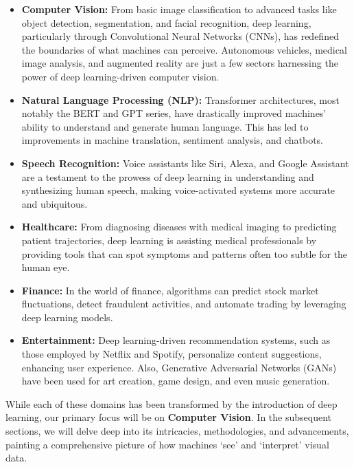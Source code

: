 \begin{itemize}
    \item \textbf{Computer Vision:} From basic image classification to advanced tasks like object detection, segmentation, and facial recognition, deep learning, particularly through Convolutional Neural Networks (CNNs), has redefined the boundaries of what machines can perceive. Autonomous vehicles, medical image analysis, and augmented reality are just a few sectors harnessing the power of deep learning-driven computer vision.
    
    \item \textbf{Natural Language Processing (NLP):} Transformer architectures, most notably the BERT and GPT series, have drastically improved machines' ability to understand and generate human language. This has led to improvements in machine translation, sentiment analysis, and chatbots.
    
    \item \textbf{Speech Recognition:} Voice assistants like Siri, Alexa, and Google Assistant are a testament to the prowess of deep learning in understanding and synthesizing human speech, making voice-activated systems more accurate and ubiquitous.
    
    \item \textbf{Healthcare:} From diagnosing diseases with medical imaging to predicting patient trajectories, deep learning is assisting medical professionals by providing tools that can spot symptoms and patterns often too subtle for the human eye.
    
    \item \textbf{Finance:} In the world of finance, algorithms can predict stock market fluctuations, detect fraudulent activities, and automate trading by leveraging deep learning models.
    
    \item \textbf{Entertainment:} Deep learning-driven recommendation systems, such as those employed by Netflix and Spotify, personalize content suggestions, enhancing user experience. Also, Generative Adversarial Networks (GANs) have been used for art creation, game design, and even music generation.
\end{itemize}

While each of these domains has been transformed by the introduction of deep learning, our primary focus will be on \textbf{Computer Vision}. In the subsequent sections, we will delve deep into its intricacies, methodologies, and advancements, painting a comprehensive picture of how machines `see' and `interpret' visual data.

